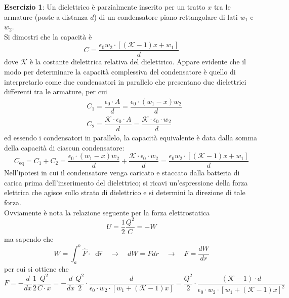 \documentclass[a4paper]{extarticle}
\newcommand\dif{\mathop{}\!\mathrm{d}}
\begin{document}
\vspace{2em}
\noindent
\textbf{Esercizio 1}: Un dielettrico è parzialmente inserito per un tratto $x$ tra le armature (poste a distanza $d$) di un condensatore piano rettangolare di lati $w_1$ e $w_2$.\\
Si dimostri che la capacità è
\[C=\frac{\epsilon_0 w_2 \cdot \left[(\mathcal{K}-1)x + w_1\right]}{d}\]
dove $\mathcal{K}$ è la costante dielettrica relativa del dielettrico. Appare evidente che il modo per determinare la capacità complessiva del condensatore è quello di interpretarlo come due condensatori in parallelo che presentano due dielettrici differenti tra le armature, per cui
\begin{align*}
  &C_1=\dfrac{\epsilon_0 \cdot A}{d}=\dfrac{\epsilon_0 \cdot (w_1-x)w_2}{d}\\
  &C_2=\dfrac{\mathcal{K} \cdot \epsilon_0 \cdot A}{d}=\dfrac{\mathcal{K} \cdot \epsilon_0 \cdot w_2}{d}
\end{align*}
ed essendo i condensatori in parallelo, la capacità equivalente è data dalla somma della capacità di ciascun condensatore:
\[C_\text{eq}=C_1+C_2=\dfrac{\epsilon_0 \cdot (w_1-x)w_2}{d}+\dfrac{\mathcal{K} \cdot \epsilon_0 \cdot w_2}{d}=\frac{\epsilon_0 w_2 \cdot \left[(\mathcal{K}-1)x + w_1\right]}{d}\]
Nell'ipotesi in cui il condensatore venga caricato e staccato dalla batteria di carica prima dell'inserimento del dielettrico; si ricavi un'espressione della forza elettrica che agisce sullo strato di dielettrico e si determini la direzione di tale forza.\\
Ovviamente è nota la relazione seguente per la forza elettrostatica
\[U=\frac{1}{2} \frac{Q^2}{C}=-W\]
ma sapendo che
\[W=\int_a^b \hat F \cdot \dif \hat r \hspace{1em} \rightarrow \hspace{1em} dW=Fdr \hspace{1em} \rightarrow \hspace{1em} F=\frac{dW}{dr}\]
per cui si ottiene che
\[F=-\frac{d}{dx}\frac{1}{2} \frac{Q^2}{C \cdot x} =-\frac{d}{dx} \frac{Q^2}{2} \cdot \frac{d}{\epsilon_0 \cdot w_2 \cdot \left[w_1+(\mathcal{K}-1)x\right]}=\frac{Q^2}{2} \cdot \frac{(\mathcal{K}-1)\cdot d}{\epsilon_0 \cdot w_2 \cdot \left[w_1+(\mathcal{K}-1)x\right]^2}\]
\end{document}
